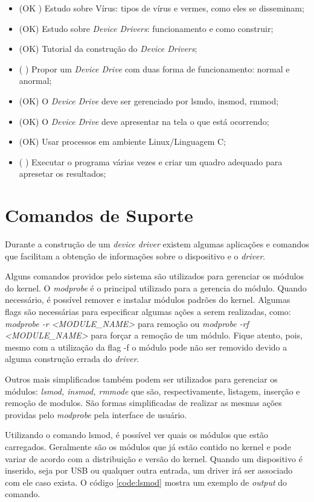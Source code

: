\begin{itemize}
  \item (OK ) Estudo sobre Vírus: tipos de vírus e vermes, como eles se disseminam;
  \item (OK) Estudo sobre \textit{Device Drivers}: funcionamento e como construir;
  \item (OK) Tutorial da construção do \textit{Device Drivers};
  \item (  ) Propor um \textit{Device Drive} com duas forma de funcionamento: normal e anormal;
  \item (OK) O \textit{Device Drive} deve ser gerenciado por lsmdo, insmod, rmmod;
  \item (OK) O \textit{Device Drive} deve apresentar na tela o que está ocorrendo;
  \item (OK) Usar processos em ambiente Linux/Linguagem C;
  \item (  ) Executar o programa várias vezes e criar um quadro adequado para apresetar os resultados;
\end{itemize}

\section{Comandos de Suporte}
\label{utils}
Durante a construção de um \textit{device driver} existem algumas aplicações e comandos que facilitam
a obtenção de informações sobre o dispositivo e o \textit{driver}.

Alguns comandos providos pelo sistema são utilizados para gerenciar os módulos do kernel.
O \textit{modprobe} é o principal utilizado para a gerencia do módulo. Quando necessário, é possível
remover e instalar módulos padrões do kernel. Algumas flags são necessárias para especificar
algumas ações a serem realizadas, como: \textit{modprobe -r <MODULE\_NAME>} para remoção ou 
\textit{modprobe -rf <MODULE\_NAME>} para forçar a remoção de um módulo. Fique atento, pois, mesmo
com a utilização da flag -f o módulo pode não ser removido devido a alguma construção errada
do \textit{driver}.

Outros mais simplificados também podem ser utilizados para gerenciar os módulos: \textit{lsmod, insmod, rmmode}
que são, respectivamente, listagem, inserção e remoção de modulos. São formas simplificadas
de realizar as mesmas ações providas pelo \textit{modprobe} pela interface de usuário.

Utilizando o comando lsmod, é possível ver quais os módulos que estão carregados. Geralmente são
os módulos que já estão contido no kernel e pode variar de acordo com a distribuição e versão do
kernel. Quando um dispositivo é inserido, seja por USB ou qualquer outra entrada, um driver irá
ser associado com ele caso exista. O código \ref{code:lsmod} mostra um exemplo de \textit{output} do comando.

